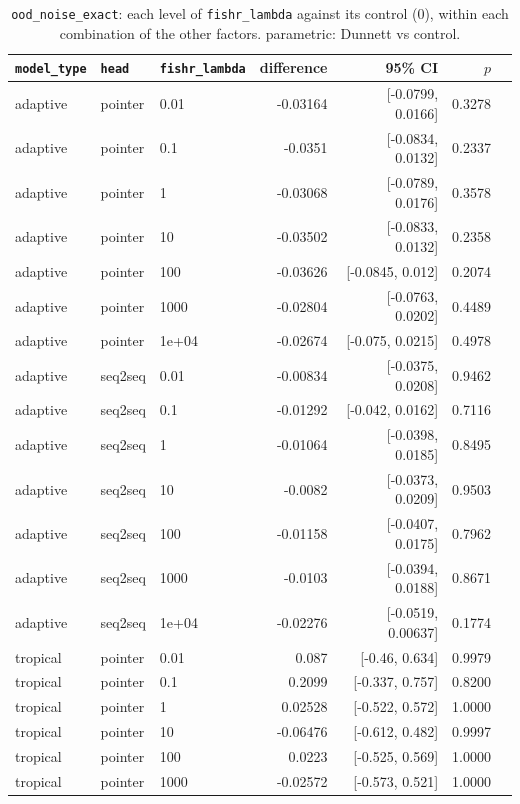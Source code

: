 \documentclass[10pt]{article}
\begin{document}
{\small
\begin{longtable}{lllrrrl}
\caption{\texttt{ood\_noise\_exact}: each level of \texttt{fishr\_lambda} against its control (0), within each combination of the other factors. parametric: Dunnett vs control.}\label{tab:control-ood_noise_exact}\\
\toprule
\texttt{model\_type} & \texttt{head} & \texttt{fishr\_lambda} & difference & 95\% CI & $p$ & \\
\midrule
\endhead
adaptive & pointer & 0.01 & -0.03164 & [-0.0799, 0.0166] & 0.3278 & \\
adaptive & pointer & 0.1 & -0.0351 & [-0.0834, 0.0132] & 0.2337 & \\
adaptive & pointer & 1 & -0.03068 & [-0.0789, 0.0176] & 0.3578 & \\
adaptive & pointer & 10 & -0.03502 & [-0.0833, 0.0132] & 0.2358 & \\
adaptive & pointer & 100 & -0.03626 & [-0.0845, 0.012] & 0.2074 & \\
adaptive & pointer & 1000 & -0.02804 & [-0.0763, 0.0202] & 0.4489 & \\
adaptive & pointer & 1e+04 & -0.02674 & [-0.075, 0.0215] & 0.4978 & \\
adaptive & seq2seq & 0.01 & -0.00834 & [-0.0375, 0.0208] & 0.9462 & \\
adaptive & seq2seq & 0.1 & -0.01292 & [-0.042, 0.0162] & 0.7116 & \\
adaptive & seq2seq & 1 & -0.01064 & [-0.0398, 0.0185] & 0.8495 & \\
adaptive & seq2seq & 10 & -0.0082 & [-0.0373, 0.0209] & 0.9503 & \\
adaptive & seq2seq & 100 & -0.01158 & [-0.0407, 0.0175] & 0.7962 & \\
adaptive & seq2seq & 1000 & -0.0103 & [-0.0394, 0.0188] & 0.8671 & \\
adaptive & seq2seq & 1e+04 & -0.02276 & [-0.0519, 0.00637] & 0.1774 & \\
tropical & pointer & 0.01 & 0.087 & [-0.46, 0.634] & 0.9979 & \\
tropical & pointer & 0.1 & 0.2099 & [-0.337, 0.757] & 0.8200 & \\
tropical & pointer & 1 & 0.02528 & [-0.522, 0.572] & 1.0000 & \\
tropical & pointer & 10 & -0.06476 & [-0.612, 0.482] & 0.9997 & \\
tropical & pointer & 100 & 0.0223 & [-0.525, 0.569] & 1.0000 & \\
tropical & pointer & 1000 & -0.02572 & [-0.573, 0.521] & 1.0000 & \\

\end{longtable}}
\end{document}
